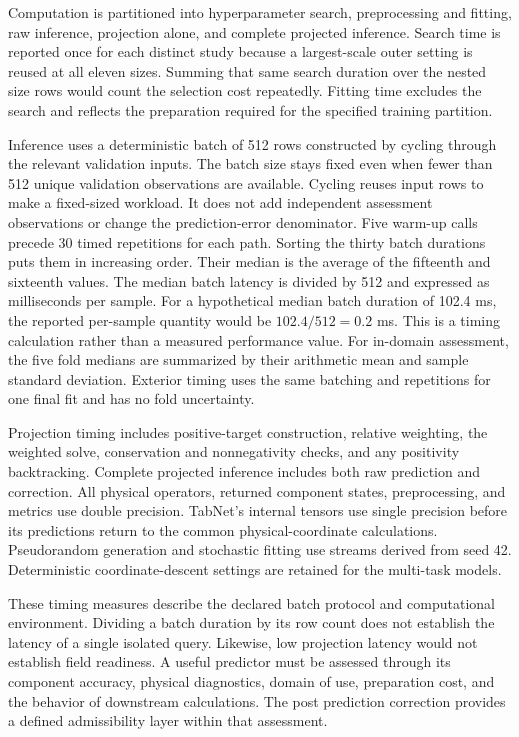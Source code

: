 Computation is partitioned into hyperparameter search, preprocessing and fitting, raw inference, projection alone, and complete projected inference. Search time is reported once for each distinct study because a largest-scale outer setting is reused at all eleven sizes. Summing that same search duration over the nested size rows would count the selection cost repeatedly. Fitting time excludes the search and reflects the preparation required for the specified training partition.

Inference uses a deterministic batch of 512 rows constructed by cycling through the relevant validation inputs. The batch size stays fixed even when fewer than 512 unique validation observations are available. Cycling reuses input rows to make a fixed-sized workload. It does not add independent assessment observations or change the prediction-error denominator. Five warm-up calls precede 30 timed repetitions for each path. Sorting the thirty batch durations puts them in increasing order. Their median is the average of the fifteenth and sixteenth values. The median batch latency is divided by 512 and expressed as milliseconds per sample. For a hypothetical median batch duration of 102.4 ms, the reported per-sample quantity would be $102.4/512=0.2$ ms. This is a timing calculation rather than a measured performance value. For in-domain assessment, the five fold medians are summarized by their arithmetic mean and sample standard deviation. Exterior timing uses the same batching and repetitions for one final fit and has no fold uncertainty.

Projection timing includes positive-target construction, relative weighting, the weighted solve, conservation and nonnegativity checks, and any positivity backtracking. Complete projected inference includes both raw prediction and correction. All physical operators, returned component states, preprocessing, and metrics use double precision. TabNet's internal tensors use single precision before its predictions return to the common physical-coordinate calculations. Pseudorandom generation and stochastic fitting use streams derived from seed 42. Deterministic coordinate-descent settings are retained for the multi-task models.

These timing measures describe the declared batch protocol and computational environment. Dividing a batch duration by its row count does not establish the latency of a single isolated query. Likewise, low projection latency would not establish field readiness. A useful predictor must be assessed through its component accuracy, physical diagnostics, domain of use, preparation cost, and the behavior of downstream calculations. The post prediction correction provides a defined admissibility layer within that assessment.
